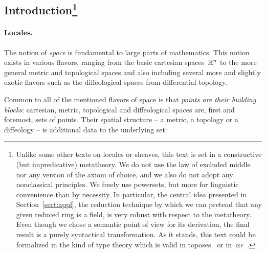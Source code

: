\documentclass{ws-rv9x6}
\begin{document}
{\begin{abstract}
The purpose of this contribution is to give a coherent account of a particular
narrative which links locales, geometric theories, sheaf semantics and
constructive commutative algebra. We are hoping to convey a firm grasp of three
ideas:
(1)~Locales are a kind of space in which opens instead of points are
fundamental.
(2)~Sheaf semantics allows us to explore mathematical objects from custom-tailored
mathematical universes.
(3)~Without loss of generality, any reduced ring is a field.
\end{abstract}
\body

\tableofcontents

\subsection*{Introduction\footnote{
Unlike some other texts on locales or sheaves, this text is set in a
constructive (but impredicative) metatheory. We do not use the law of excluded
middle nor any version of the axiom of choice, and we also do not adopt any
nonclassical principles. We freely use powersets, but more for linguistic
convenience than by necessity.
In particular, the central idea presented in
Section~\ref{sect:appl}, the reduction technique by which we can pretend that any
given reduced ring is a field, is very robust with respect to the metatheory.
Even though we chose a semantic point of view for its derivation, the final
result is a purely syntactical transformation. As it stands, this text could be
formalized in the kind of type theory which is valid in
toposes~\cite{maietti:modular-correspondence} or
in~\textsc{izf}~\cite{crosilla:cst-izf}.}}


\paragraph{Locales.}

The notion of \emph{space} is fundamental to large parts of mathematics. This notion
exists in various flavors, ranging from the basic cartesian spaces~$\mathbb{R}^n$ to
the more general metric and topological spaces and also including several more
and slightly exotic flavors such as the diffeological spaces from differential topology.

Common to all of the mentioned flavors of space is that \emph{points are their
building blocks}: cartesian, metric, topological and diffeological spaces are,
first and foremost, sets of points. Their spatial structure -- a metric, a
topology or a diffeology -- is additional data to the underlying set:

}
\end{document}
